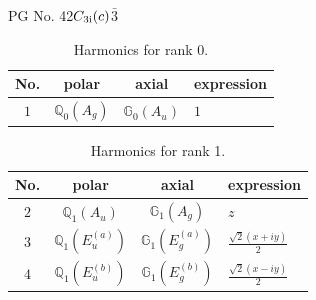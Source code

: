 \documentclass[fleqn,8pt,landscape]{jsarticle}
\begin{document}
\setcounter{MaxMatrixCols}{32}

\renewcommand{\tablename}{Table~}
\renewcommand{\figurename}{Figure~}
\begin{center}
\LARGE
PG No. 42\quad$C_{\rm 3i}(c)$\quad$\bar{3}$\quad[ trigonal ]
\end{center}
\begin{table}[ht!]
\begin{center}
\caption{Harmonics for rank 0.}
\renewcommand{\arraystretch}{1.3}
\begin{tabular}{cccl} \hline \hline
No. & polar & axial & expression \\ \hline
$ 1 $ & $ \mathbb{Q}_{0}(A_{g}) $ & $ \mathbb{G}_{0}(A_{u}) $ & $ 1 $ \\
 \hline \hline
\end{tabular}
\end{center}
\end{table}
\begin{table}[ht!]
\begin{center}
\caption{Harmonics for rank 1.}
\renewcommand{\arraystretch}{1.3}
\begin{tabular}{cccl} \hline \hline
No. & polar & axial & expression \\ \hline
$ 2 $ & $ \mathbb{Q}_{1}(A_{u}) $ & $ \mathbb{G}_{1}(A_{g}) $ & $ z $ \\
$ 3 $ & $ \mathbb{Q}_{1}(E_{u}^{(a)}) $ & $ \mathbb{G}_{1}(E_{g}^{(a)}) $ & $ \frac{\sqrt{2} \left(x + i y\right)}{2} $ \\
$ 4 $ & $ \mathbb{Q}_{1}(E_{u}^{(b)}) $ & $ \mathbb{G}_{1}(E_{g}^{(b)}) $ & $ \frac{\sqrt{2} \left(x - i y\right)}{2} $ \\
 \hline \hline
\end{tabular}
\end{center}
\end{table}
\end{document}
